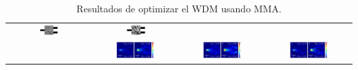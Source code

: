 \begin{landscape}
\begin{table}[ht]
\begin{tabular}{|c|c|c|c|}
      \includegraphics[width=0.24\textwidth]{image/results/wdm/MMA/visualize_eps_disc_512.png} &
      \includegraphics[width=0.24\textwidth]{image/results/wdm/MMA/visualize_eps_fab_512.png} \\
      \cline{2-4}
      &
      \includegraphics[width=0.50\textwidth]{image/results/wdm/MMA/visualize_field_cont_512.png} &
      \includegraphics[width=0.50\textwidth]{image/results/wdm/MMA/visualize_field_disc_512.png} &
      \includegraphics[width=0.50\textwidth]{image/results/wdm/MMA/visualize_field_fab_512.png} \\
    \hline
    \end{tabular}
    \hspace*{-5cm}
    \caption{Resultados de optimizar el WDM usando MMA.}
    \label{tab:opt-MMA-wdm}
\end{table}
\end{landscape}

